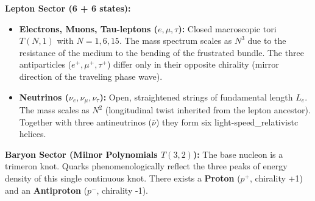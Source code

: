\documentclass[11pt,a4paper]{article}
\begin{document}
\textbf{Lepton Sector (6 + 6 states):}
\begin{itemize}
    \item \textbf{Electrons, Muons, Tau-leptons ($e, \mu, \tau$):} Closed macroscopic tori $T(N,1)$ with $N = 1, 6, 15$. The mass spectrum scales as $N^3$ due to the resistance of the medium to the bending of the frustrated bundle. The three antiparticles ($e^+, \mu^+, \tau^+$) differ only in their opposite chirality (mirror direction of the traveling phase wave).
    \item \textbf{Neutrinos ($\nu_e, \nu_\mu, \nu_\tau$):} Open, straightened strings of fundamental length $L_e$. The mass scales as $N^2$ (longitudinal twist inherited from the lepton ancestor). Together with three antineutrinos ($\bar{\nu}$) they form six light-speed_relativistc helices.
\end{itemize}

\textbf{Baryon Sector (Milnor Polynomials $T(3,2)$):}
The base nucleon is a trimeron knot. Quarks phenomenologically reflect the three peaks of energy density of this single continuous knot. There exists a \textbf{Proton} ($p^+$, chirality +1) and an \textbf{Antiproton} ($p^-$, chirality -1).
\end{document}
